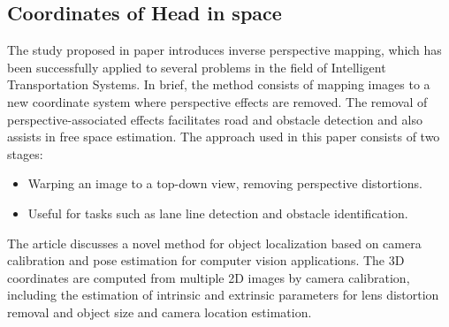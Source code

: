 \subsection{Coordinates of Head in space}
The study proposed in paper \cite{miguel2014multimodal} introduces inverse perspective mapping, which has been successfully applied to several problems in the field of Intelligent Transportation Systems. In brief, the method consists of mapping images to a new coordinate system where perspective effects are removed. The removal of perspective-associated effects facilitates road and obstacle detection and also assists in free space estimation. The approach used in this paper consists of two stages:
\begin{itemize}
	\item Warping an image to a top-down view, removing perspective distortions.
	\item Useful for tasks such as lane line detection and obstacle identification.
\end{itemize}

The article \cite{taha2021localization} discusses a novel method for object localization based on camera calibration and pose estimation for computer vision applications. The 3D coordinates are computed from multiple 2D images by camera calibration, including the estimation of intrinsic and extrinsic parameters for lens distortion removal and object size and camera location estimation.
